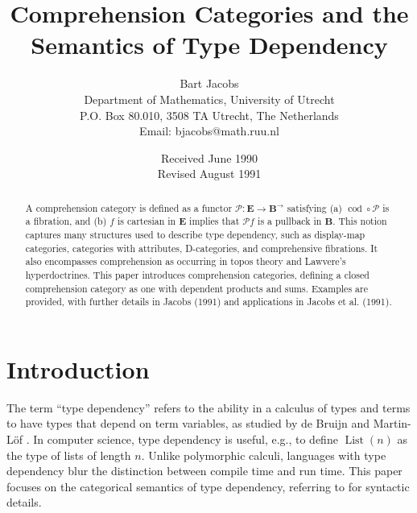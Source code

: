 \documentclass{article}
\begin{document}
\title{Comprehension Categories and the Semantics of Type Dependency}
\author{Bart Jacobs \\ Department of Mathematics, University of Utrecht \\ P.O. Box 80.010, 3508 TA Utrecht, The Netherlands \\ Email: bjacobs@math.ruu.nl}
\date{Received June 1990 \\ Revised August 1991}

\maketitle

\begin{abstract}
A comprehension category is defined as a functor $\mathscr{P}: \mathbf{E} \to \mathbf{B}^{\to}$ satisfying (a) $\operatorname{cod} \circ \mathscr{P}$ is a fibration, and (b) $f$ is cartesian in $\mathbf{E}$ implies that $\mathscr{P} f$ is a pullback in $\mathbf{B}$. This notion captures many structures used to describe type dependency, such as display-map categories, categories with attributes, D-categories, and comprehensive fibrations. It also encompasses comprehension as occurring in topos theory and Lawvere's hyperdoctrines. This paper introduces comprehension categories, defining a closed comprehension category as one with dependent products and sums. Examples are provided, with further details in Jacobs (1991) and applications in Jacobs et al. (1991).
\end{abstract}

\ifincludeTOC
  \tableofcontents
\fi

\newpage
\section{Introduction}

The term ``type dependency'' refers to the ability in a calculus of types and terms to have types that depend on term variables, as studied by de Bruijn \cite{deBruijn1970} and Martin-L\"of \cite{MartinLof1984}. In computer science, type dependency is useful, e.g., to define $\operatorname{List}(n)$ as the type of lists of length $n$. Unlike polymorphic calculi, languages with type dependency blur the distinction between compile time and run time. This paper focuses on the categorical semantics of type dependency, referring to \cite{MartinLof1984, Troelstra1986} for syntactic details.
\end{document}
